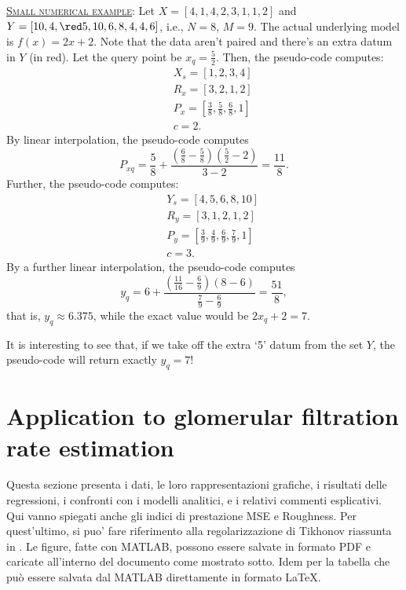 \documentclass[10pt,final]{siamltex}
\begin{document}
\begin{tcolorbox}[colback=gray!30,%
  colframe=black,%
  width=\dimexpr\linewidth-2\fboxrule\relax,
  arc=3mm, auto outer arc,
  breakable
  ]
  \underline{\textsc{Small numerical example}}: Let $X=[4,1,4,2,3,1,1,2]$ and $Y=[10,     4,    {\red 5},10,     6,     8,     4,     4,     6]$, i.e., $N=8$, $M=9$. The actual underlying model is $f(x)=2x+2$. Note that the data aren't paired and there's an extra datum in $Y$ (in red). Let the query point be $x_q=\tfrac{5}{2}$. Then, the pseudo-code computes:
  \begin{eqnarray*}
    && X_s = [1,     2,     3,     4]\\
    && R_x = [3,     2,     1,     2]\\
    && P_x = [\tfrac{3}{8}, \tfrac{5}{8}, \tfrac{6}{8}, 1]\\
    && c = 2.
  \end{eqnarray*}
  By linear interpolation, the pseudo-code computes
  \begin{equation*}
    P_{xq}=\frac{5}{8}+\frac{\left(\tfrac{6}{8}-\tfrac{5}{8}\right)\left(\tfrac{5}{2}-2\right)}{3-2}=\frac{11}{8}.
  \end{equation*}
  Further, the pseudo-code computes:
  \begin{eqnarray*}
    && Y_s = [4,     5,     6,     8,    10]\\
    && R_y = [3,     1,     2,     1,     2]\\
    && P_y = [\tfrac{3}{9}, \tfrac{4}{9}, \tfrac{6}{9}, \tfrac{7}{9}, 1]\\
    && c = 3.
  \end{eqnarray*}
  By a further linear interpolation, the pseudo-code computes
  \begin{equation*}
    y_q = 6 + \frac{\left(\tfrac{11}{16}-\tfrac{6}{9}\right)\left(8-6\right)}{\tfrac{7}{9}-\tfrac{6}{9}}=\frac{51}{8},
  \end{equation*}
  that is, $y_q\approx 6.375$, while the exact value would be $2x_q+2=7$.

  It is interesting to see that, if we take off the extra `5' datum from the set $Y$, the pseudo-code will return exactly $y_q=7$!
\end{tcolorbox}
%
\section{Application to glomerular filtration rate estimation}\label{sec3}
%
{{\red Questa sezione presenta i dati, le loro rappresentazioni grafiche, i risultati delle regressioni, i confronti con i modelli analitici, e i relativi commenti esplicativi. Qui vanno spiegati anche gli indici di prestazione MSE e Roughness. Per quest'ultimo, si puo' fare riferimento alla regolarizzazione di Tikhonov riassunta in \cite{bishop}. Le figure, fatte con MATLAB, possono essere salvate in formato PDF e caricate all'interno del documento come mostrato sotto. Idem per la tabella che può essere salvata dal MATLAB direttamente in formato LaTeX.}}
\end{document}
